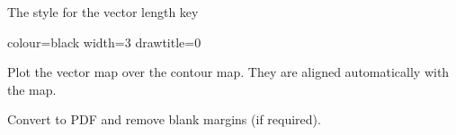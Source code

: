 The style for the vector length key

\begin{terminalv}
colour=black
width=3
drawtitle=0
\end{terminalv}


Plot the vector map over the contour map. They are aligned automatically with the map.

\begin{terminalv}
\end{terminalv}


Convert to PDF and remove blank margins (if required).

\begin{terminalv}
\end{terminalv}
